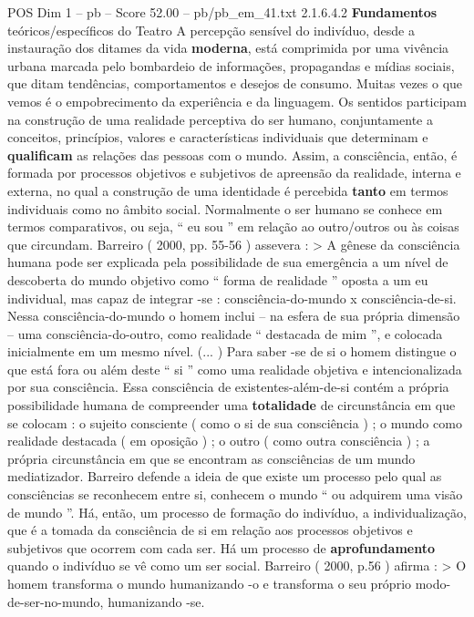 \begin{textsample}{POS Dim 1 – pb – Score 52.00 – pb/pb\_em\_41.txt}  \label{ex:f1_pos_147}
2.1.6.4.2 \textbf{Fundamentos} teóricos/específicos do Teatro A percepção sensível do indivíduo, desde a instauração dos ditames da vida \textbf{moderna}, está comprimida por uma vivência urbana marcada pelo bombardeio de informações, propagandas e mídias sociais, que ditam tendências, comportamentos e desejos de consumo.
Muitas vezes o que vemos é o empobrecimento da experiência e da linguagem.
Os sentidos participam na construção de uma realidade perceptiva do ser humano, conjuntamente a conceitos, princípios, valores e características individuais que determinam e \textbf{qualificam} as relações das pessoas com o mundo.
Assim, a consciência, então, é formada por processos objetivos e subjetivos de apreensão da realidade, interna e externa, no qual a construção de uma identidade é percebida \textbf{tanto} em termos individuais como no âmbito social.
Normalmente o ser humano se conhece em termos comparativos, ou seja, “ eu sou ” em relação ao outro/outros ou às coisas que circundam.
Barreiro ( 2000, pp. 55-56 ) assevera : > A gênese da consciência humana pode ser explicada pela possibilidade de sua emergência a um nível de descoberta do mundo objetivo como “ forma de realidade ” oposta a um eu individual, mas capaz de integrar -se : consciência-do-mundo x consciência-de-si.
Nessa consciência-do-mundo o homem inclui – na esfera de sua própria dimensão – uma consciência-do-outro, como realidade “ destacada de mim ”, e colocada inicialmente em um mesmo nível. (... ) Para saber -se de si o homem distingue o que está fora ou além deste “ si ” como uma realidade objetiva e intencionalizada por sua consciência.
Essa consciência de existentes-além-de-si contém a própria possibilidade humana de compreender uma \textbf{totalidade} de circunstância em que se colocam : o sujeito consciente ( como o si de sua consciência ) ; o mundo como realidade destacada ( em oposição ) ; o outro ( como outra consciência ) ; a própria circunstância em que se encontram as consciências de um mundo mediatizador.
Barreiro defende a ideia de que existe um processo pelo qual as consciências se reconhecem entre si, conhecem o mundo “ ou adquirem uma visão de mundo ”.
Há, então, um processo de formação do indivíduo, a individualização, que é a tomada da consciência de si em relação aos processos objetivos e subjetivos que ocorrem com cada ser.
Há um processo de \textbf{aprofundamento} quando o indivíduo se vê como um ser social.
Barreiro ( 2000, p.56 ) afirma : > O homem transforma o mundo humanizando -o e transforma o seu próprio modo-de-ser-no-mundo, humanizando -se.

\end{textsample}
